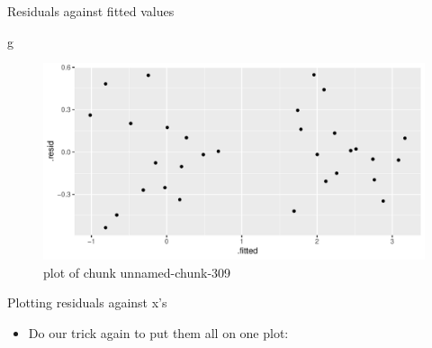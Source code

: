 \documentclass[
  ignorenonframetext,
]{beamer}
\newenvironment{Shaded}{\begin{snugshade}}{\end{snugshade}}
\newcommand{\DataTypeTok}[1]{\textcolor[rgb]{0.13,0.29,0.53}{#1}}
\newcommand{\DecValTok}[1]{\textcolor[rgb]{0.00,0.00,0.81}{#1}}
\newcommand{\FloatTok}[1]{\textcolor[rgb]{0.00,0.00,0.81}{#1}}
\newcommand{\KeywordTok}[1]{\textcolor[rgb]{0.13,0.29,0.53}{\textbf{#1}}}
\newcommand{\NormalTok}[1]{#1}
\newcommand{\OperatorTok}[1]{\textcolor[rgb]{0.81,0.36,0.00}{\textbf{#1}}}
\newcommand{\StringTok}[1]{\textcolor[rgb]{0.31,0.60,0.02}{#1}}
\providecommand{\tightlist}{%
  \setlength{\itemsep}{0pt}\setlength{\parskip}{0pt}}
\begin{document}
\begin{frame}[fragile]{Residuals against fitted values}
\protect\hypertarget{residuals-against-fitted-values}{}

\begin{Shaded}
\begin{Highlighting}[]
\NormalTok{g}
\end{Highlighting}
\end{Shaded}

\begin{figure}
\centering
\includegraphics{figure/unnamed-chunk-309-1.pdf}
\caption{plot of chunk unnamed-chunk-309}
\end{figure}

\end{frame}

\begin{frame}[fragile]{Plotting residuals against x's}
\protect\hypertarget{plotting-residuals-against-xs}{}

\begin{itemize}
\tightlist
\item
  Do our trick again to put them all on one plot:
\end{itemize}

\begin{Shaded}
\end{Shaded}

\end{frame}
\end{document}
